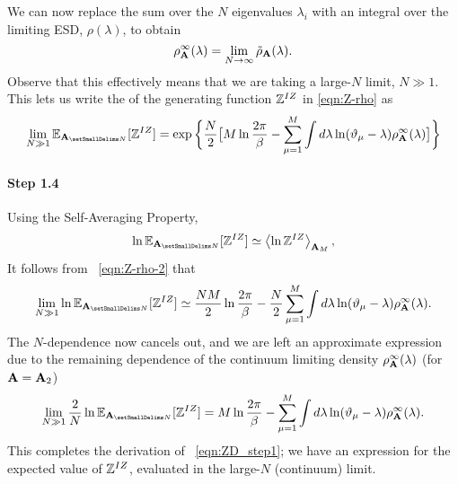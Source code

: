 We can now replace
the sum over the $N$ eigenvalues $\lambda_{i}$ with an integral over the limiting
ESD, $\rho(\lambda)$, to obtain
\begin{equation}
\label{eqn:rho-}
\rho^{\infty}_{\mathbf{A}}(\lambda)=    \lim_{N\rightarrow\infty}\tilde\rho_{\mathbf{A}}(\lambda)  .
\end{equation}
Observe that this effectively means that we are taking a large-$N$ limit, $N\gg 1$.
%
This lets us write the \ExpectedValue of the generating function $\mathbb{Z}^{IZ}$
in \ref{eqn:Z-rho}
as
\begin{equation}
\label{eqn:Z-rho-2}
    \lim_{N\gg 1}\EZDATWO=\exp\bigg\{\dfrac{N}{2}\big[M\ln\dfrac{2\pi}{\beta}-
    \sum_{\mu=1}^{M}\int
        d\lambda\ln(\DeltaMu-\lambda)\rho^{\infty}_{\AMAT}(\lambda)\big]\bigg\}
\end{equation}

\paragraph{Step 1.4}

Using the Self-Averaging Property,
\begin{equation}
   \ln \EZDATWO \simeq \Expected[\mathbf{A}_M]{\ln \ZD} ,
\end{equation}
It follows from \EQN~\ref{eqn:Z-rho-2}
that
\begin{equation}
   \lim_{N\gg 1} \ln \EZDATWO
   \simeq \dfrac{N M}{2}\ln\dfrac{2\pi}{\beta}
         -\dfrac{N}{2}\sum_{\mu=1}^{M}\int d\lambda\ln(\DeltaMu-\lambda)\rho^{\infty}_{\AMAT}(\lambda)  .
\end{equation}
%
The $N$-dependence now cancels out,
and we are left an approximate expression due to the remaining dependence of the continuum limiting density
$\rho^{\infty}_{\mathbf{A}}(\lambda)$ (for $\mathbf{A}=\mathbf{A}_{2}$)
%
\begin{equation}
\label{eqn:ln-Z-Nlim2}
    \lim_{N \gg 1}\dfrac{2}{N}\ln \EZDATWO
    = M\ln\dfrac{2\pi}{\beta}-\sum_{\mu=1}^{M}\int d\lambda\ln(\DeltaMu-\lambda)\rho^{\infty}_{\AMAT}(\lambda)  .
\end{equation}
This completes the derivation of \EQN~\ref{eqn:ZD_step1}; 
we have an expression for the expected value of $\mathbb{Z}^{IZ}$,
evaluated in the large-$N$ (continuum) limit.


